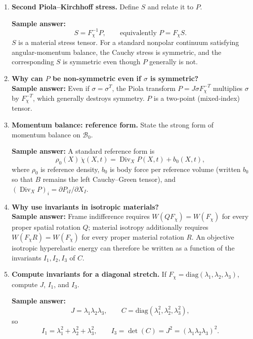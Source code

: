 \documentclass[12pt]{article}
\begin{document}
\begin{enumerate}
\item \textbf{Second Piola--Kirchhoff stress.}
Define $S$ and relate it to $P$.

\textbf{Sample answer:}
\[
S = F_\chi^{-1}P,\qquad \text{equivalently } P = F_\chi S.
\]
$S$ is a material stress tensor. For a standard nonpolar continuum satisfying angular-momentum
balance, the Cauchy stress is symmetric, and the corresponding $S$ is symmetric even though
$P$ generally is not.

\item \textbf{Why can $P$ be non-symmetric even if $\sigma$ is symmetric?}\\
\textbf{Sample answer:}
Even if $\sigma=\sigma^T$, the Piola transform $P=J\sigma F_\chi^{-T}$ multiplies $\sigma$
by $F_\chi^{-T}$, which generally destroys symmetry. $P$ is a two-point (mixed-index) tensor.

\item \textbf{Momentum balance: reference form.}
State the strong form of momentum balance on $\mathcal{B}_0$.

\textbf{Sample answer:}
A standard reference form is
\[
\rho_0(X)\,\ddot{\chi}(X,t) = \operatorname{Div}_X P(X,t) + b_0(X,t),
\]
where $\rho_0$ is reference density, $b_0$ is body force per reference volume
(written $b_0$ so that $B$ remains the left Cauchy--Green tensor), and
$(\operatorname{Div}_X P)_i=\partial P_{iI}/\partial X_I$.

\item \textbf{Why use invariants in isotropic materials?}\\
\textbf{Sample answer:}
Frame indifference requires $W(QF_\chi)=W(F_\chi)$ for every proper spatial rotation $Q$;
material isotropy additionally requires $W(F_\chi R)=W(F_\chi)$ for every proper material
rotation $R$. An objective isotropic hyperelastic energy can therefore be written as a function
of the invariants $I_1,I_2,I_3$ of $C$.

\item \textbf{Compute invariants for a diagonal stretch.}
If $F_\chi=\mathrm{diag}(\lambda_1,\lambda_2,\lambda_3)$, compute $J$, $I_1$, and $I_3$.

\textbf{Sample answer:}
\[
J=\lambda_1\lambda_2\lambda_3,\qquad
C=\mathrm{diag}(\lambda_1^2,\lambda_2^2,\lambda_3^2),
\]
so
\[
I_1=\lambda_1^2+\lambda_2^2+\lambda_3^2,\qquad
I_3=\det(C)=J^2=(\lambda_1\lambda_2\lambda_3)^2.
\]


\end{enumerate}
\end{document}

